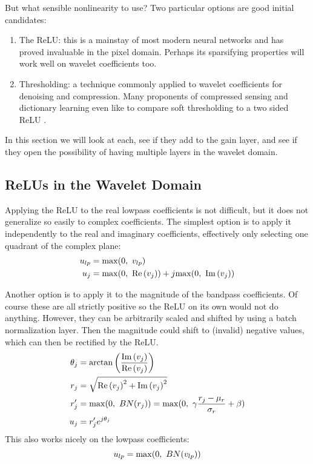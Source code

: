 But what sensible nonlinearity to use? Two particular options are good initial
candidates:
\begin{enumerate}
  \item The ReLU: this is a mainstay of most modern neural networks and has
    proved invaluable in the pixel domain. Perhaps its sparsifying properties
    will work well on wavelet coefficients too. 
  \item Thresholding: a technique commonly applied to wavelet
    coefficients for denoising and compression. Many proponents of compressed
    sensing and dictionary learning even like to compare soft thresholding to a
    two sided ReLU \cite{papyan_theoretical_2018, papyan_convolutional_2016}.
\end{enumerate}

In this section we will look at each, see if they add to the gain
layer, and see if they open the possibility of having multiple layers in the
wavelet domain. 

\subsection{ReLUs in the Wavelet Domain}
Applying the ReLU to the real lowpass coefficients is not difficult, but it does
not generalize so easily to complex coefficients. The simplest option is to apply
it independently to the real and imaginary coefficients, effectively only
selecting one quadrant of the complex plane:
\begin{align}
  u_{lp} &= \mathrm{max}(0,\ v_{lp}) \\
  u_{j} &= \mathrm{max}(0,\ \mathrm{Re}\left(v_{j}\right)) + j\mathrm{max}(0,\ \mathrm{Im}\left(v_j\right)) \label{eq:ch6:relu_bp}
\end{align}

Another option is to apply it to the magnitude of the bandpass coefficients. Of
course these are all strictly positive so the ReLU on its own would not do
anything. However, they can be arbitrarily scaled and shifted by using a batch
normalization layer. Then the magnitude could shift to (invalid) negative
values, which can then be rectified by the ReLU. %
\begin{align}
  \theta_j &= \arctan \left(\frac{\mathrm{Im}\left(v_j\right)}{\mathrm{Re}\left(v_{j}\right)} \right) \\
  r_j &= \sqrt{\mathrm{Re}\left(v_j\right)^2 + \mathrm{Im}\left(v_j\right)^2} \\
  r_j' &= \max (0,\ BN(r_j)) = \max(0,\ \gamma \frac{r_j-\mu_r}{\sigma_r} + \beta) \label{eq:ch6:magrelu_bp}\\
  u_j &= r_j' e^{j\theta_j}
\end{align}
This also works nicely on the lowpass coefficients:
\begin{equation}
  u_{lp} = \F{max}(0,\ BN(v_{lp})) \label{eq:ch6:bnrelu_lp}
\end{equation}
%
